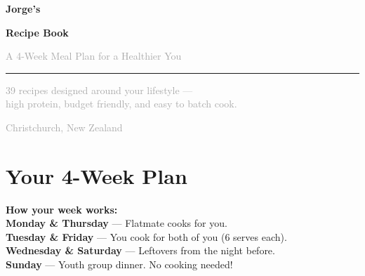 \documentclass[12pt, a4paper]{book}
\begin{document}
\begin{titlepage}
  \centering
  \vspace*{3cm}
  {\fontsize{48}{56}\selectfont\bfseries\textcolor{primary}{Jorge's}\par}
  \vspace{0.3cm}
  {\fontsize{32}{40}\selectfont\bfseries\textcolor{accent}{Recipe Book}\par}
  \vspace{0.5cm}
  {\large\textcolor{darkgray}{A 4-Week Meal Plan for a Healthier You}\par}
  \vspace{1.5cm}
  \textcolor{primary}{\rule{0.6\linewidth}{2pt}}
  \vspace{1.5cm}

  {\large\textcolor{darkgray}{
    39 recipes designed around your lifestyle ---\\[6pt]
    high protein, budget friendly, and easy to batch cook.
  }\par}

  \vfill
  {\small\textcolor{darkgray}{Christchurch, New Zealand \\ \the\year}}
\end{titlepage}

\tableofcontents
\clearpage

\chapter*{Your 4-Week Plan}

\begin{tipbox}
  \textbf{How your week works:}\\
  \textbf{Monday \& Thursday} --- Flatmate cooks for you.\\
  \textbf{Tuesday \& Friday} --- You cook for both of you (6 serves each).\\
  \textbf{Wednesday \& Saturday} --- Leftovers from the night before.\\
  \textbf{Sunday} --- Youth group dinner. No cooking needed!
\end{tipbox}

\vspace{0.5cm}
\end{document}
